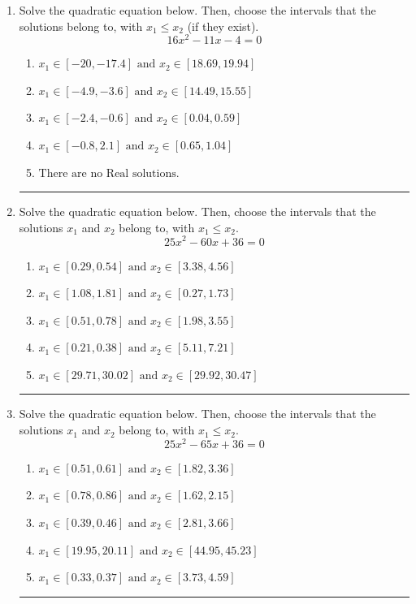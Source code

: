 \documentclass[14pt]{extbook}
\newcommand{\litem}[1]{\item#1\hspace*{-1cm}\rule{\textwidth}{0.4pt}}
\begin{document}
\begin{enumerate}
{\begin{enumerate}[label=\Alph*.]
\end{enumerate} }
\litem{
Solve the quadratic equation below. Then, choose the intervals that the solutions belong to, with $x_1 \leq x_2$ (if they exist).\[ 16x^{2} -11 x -4 = 0 \]\begin{enumerate}[label=\Alph*.]
\item \( x_1 \in [-20, -17.4] \text{ and } x_2 \in [18.69, 19.94] \)
\item \( x_1 \in [-4.9, -3.6] \text{ and } x_2 \in [14.49, 15.55] \)
\item \( x_1 \in [-2.4, -0.6] \text{ and } x_2 \in [0.04, 0.59] \)
\item \( x_1 \in [-0.8, 2.1] \text{ and } x_2 \in [0.65, 1.04] \)
\item \( \text{There are no Real solutions.} \)

\end{enumerate} }
\litem{
Solve the quadratic equation below. Then, choose the intervals that the solutions $x_1$ and $x_2$ belong to, with $x_1 \leq x_2$.\[ 25x^{2} -60 x + 36 = 0 \]\begin{enumerate}[label=\Alph*.]
\item \( x_1 \in [0.29, 0.54] \text{ and } x_2 \in [3.38, 4.56] \)
\item \( x_1 \in [1.08, 1.81] \text{ and } x_2 \in [0.27, 1.73] \)
\item \( x_1 \in [0.51, 0.78] \text{ and } x_2 \in [1.98, 3.55] \)
\item \( x_1 \in [0.21, 0.38] \text{ and } x_2 \in [5.11, 7.21] \)
\item \( x_1 \in [29.71, 30.02] \text{ and } x_2 \in [29.92, 30.47] \)

\end{enumerate} }
\litem{
Solve the quadratic equation below. Then, choose the intervals that the solutions $x_1$ and $x_2$ belong to, with $x_1 \leq x_2$.\[ 25x^{2} -65 x + 36 = 0 \]\begin{enumerate}[label=\Alph*.]
\item \( x_1 \in [0.51, 0.61] \text{ and } x_2 \in [1.82, 3.36] \)
\item \( x_1 \in [0.78, 0.86] \text{ and } x_2 \in [1.62, 2.15] \)
\item \( x_1 \in [0.39, 0.46] \text{ and } x_2 \in [2.81, 3.66] \)
\item \( x_1 \in [19.95, 20.11] \text{ and } x_2 \in [44.95, 45.23] \)
\item \( x_1 \in [0.33, 0.37] \text{ and } x_2 \in [3.73, 4.59] \)


\end{enumerate}}
\end{enumerate}
\end{document}
